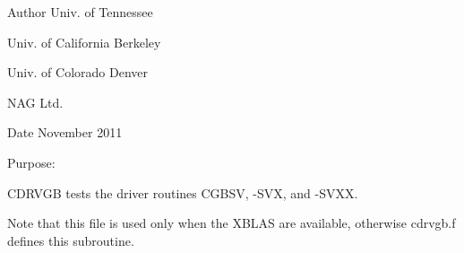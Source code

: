 \begin{DoxyAuthor}{Author}
Univ. of Tennessee 

Univ. of California Berkeley 

Univ. of Colorado Denver 

N\+A\+G Ltd. 
\end{DoxyAuthor}
\begin{DoxyDate}{Date}
November 2011
\end{DoxyDate}
\begin{DoxyParagraph}{Purpose\+: }
\begin{DoxyVerb} CDRVGB tests the driver routines CGBSV, -SVX, and -SVXX.

 Note that this file is used only when the XBLAS are available,
 otherwise cdrvgb.f defines this subroutine.\end{DoxyVerb}
 
\end{DoxyParagraph}

